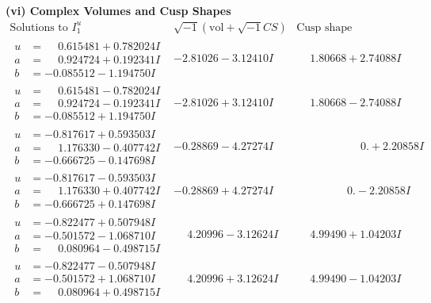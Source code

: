 \documentclass[1p]{elsarticle_modified}
\theoremstyle{definition}
\newcommand{\I}{\sqrt{-1}}
\begin{document}
\newpage\flushleft \textbf{(vi) Complex Volumes and Cusp Shapes}
$$\begin{array}{c|c|c}  
\text{Solutions to }I^u_{1}& \I (\text{vol} + \sqrt{-1}CS) & \text{Cusp shape}\\
 \hline 
\begin{aligned}
u &= \phantom{-}0.615481 + 0.782024 I \\
a &= \phantom{-}0.924724 + 0.192341 I \\
b &= -0.085512 - 1.194750 I\end{aligned}
 & -2.81026 - 3.12410 I & \phantom{-}1.80668 + 2.74088 I \\ \hline\begin{aligned}
u &= \phantom{-}0.615481 - 0.782024 I \\
a &= \phantom{-}0.924724 - 0.192341 I \\
b &= -0.085512 + 1.194750 I\end{aligned}
 & -2.81026 + 3.12410 I & \phantom{-}1.80668 - 2.74088 I \\ \hline\begin{aligned}
u &= -0.817617 + 0.593503 I \\
a &= \phantom{-}1.176330 - 0.407742 I \\
b &= -0.666725 - 0.147698 I\end{aligned}
 & -0.28869 - 4.27274 I & \phantom{-0.000000 -}0. + 2.20858 I \\ \hline\begin{aligned}
u &= -0.817617 - 0.593503 I \\
a &= \phantom{-}1.176330 + 0.407742 I \\
b &= -0.666725 + 0.147698 I\end{aligned}
 & -0.28869 + 4.27274 I & \phantom{-0.000000 } 0. - 2.20858 I \\ \hline\begin{aligned}
u &= -0.822477 + 0.507948 I \\
a &= -0.501572 - 1.068710 I \\
b &= \phantom{-}0.080964 - 0.498715 I\end{aligned}
 & \phantom{-}4.20996 - 3.12624 I & \phantom{-}4.99490 + 1.04203 I \\ \hline\begin{aligned}
u &= -0.822477 - 0.507948 I \\
a &= -0.501572 + 1.068710 I \\
b &= \phantom{-}0.080964 + 0.498715 I\end{aligned}
 & \phantom{-}4.20996 + 3.12624 I & \phantom{-}4.99490 - 1.04203 I \\ \hline\begin{aligned}

\end{aligned}
\end{array}$$
\end{document}
